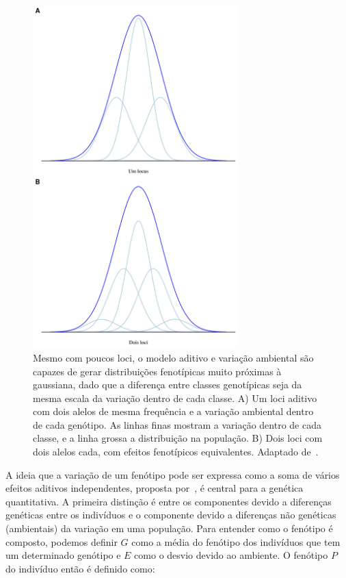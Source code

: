 \begin{refsection}
\begin{figure}
    \centering
    \includegraphics[width=300px]{discrete_gaussian.png}
    \caption[Variação contínua]{Mesmo com poucos loci, o modelo aditivo e variação ambiental são capazes de gerar distribuições fenotípicas muito próximas à gaussiana, dado que a diferença entre classes genotípicas seja da mesma escala da variação dentro de cada classe. A) Um loci aditivo com dois alelos de mesma frequência e a variação ambiental dentro de cada genótipo. As linhas finas mostram a variação dentro de cada classe, e a linha grossa a distribuição na população. B) Dois loci com dois alelos cada, com efeitos fenotípicos equivalentes. Adaptado de~\textcite{Barton2007-hq}.}
    \label{discrete_aleles}
\end{figure}

A ideia que a variação de um fenótipo pode ser expressa como a soma de vários
efeitos aditivos independentes, proposta por~\textcite{Fisher1930-bp}, é
central para a genética quantitativa. A primeira distinção é entre os
componentes devido a diferenças genéticas entre os indivíduos e o componente
devido a diferenças não genéticas (ambientais) da variação em uma população.
Para entender como o fenótipo é composto, podemos definir $G$ como a média do
fenótipo dos indivíduos que tem um determinado genótipo e $E$ como o desvio
devido ao ambiente. O fenótipo $P$ do indivíduo então é definido como:


\end{refsection}

